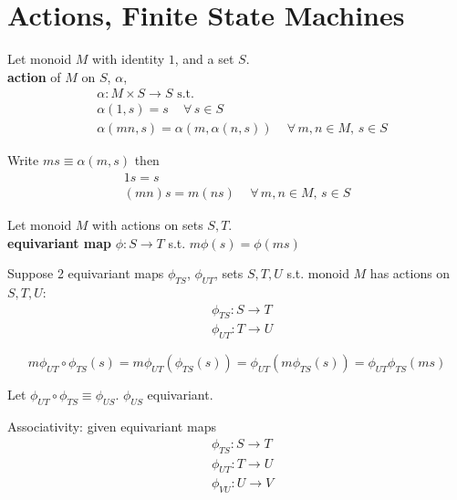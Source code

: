 \section{Actions, Finite State Machines}

\begin{definition}
Let monoid $M$ with identity $1$, and a set $S$. \\
\textbf{action} of $M$ on $S$, $\alpha$, \\
\begin{equation}
\begin{aligned}
& \alpha : M \times S \to S \text{ s.t. } \\  
& \alpha(1,s) = s \quad \, \forall \, s \in S \\
& \alpha(mn, s) = \alpha(m, \alpha(n, s)) \quad \, \forall \, m,n \in M, \, s\in S
\end{aligned}
\end{equation}

Write $ms \equiv \alpha(m, s)$ then 
\[
\begin{gathered} 
1s = s \\
(mn) s = m (ns) \quad \, \forall \, m, n \in M, \, s \in S
\end{gathered}
\]
\end{definition}

\begin{definition}
	Let monoid $M$ with actions on sets $S,T$. \\
	\textbf{equivariant map} $\phi:S \to T$ s.t. $m\phi(s) = \phi(ms)$
\end{definition}

Suppose 2 equivariant maps $\phi_{TS}$, $\phi_{UT}$, sets $S,T,U$ s.t. monoid $M$ has actions on $S,T,U$: 
\[
\begin{aligned}
& \phi_{TS} : S \to T \\ 
& \phi_{UT} : T \to U
\end{aligned}
\]

\[
m\phi_{UT} \circ \phi_{TS}(s) = m \phi_{UT}(\phi_{TS}(s)) = \phi_{UT}(m\phi_{TS}(s)) = \phi_{UT} \phi_{TS} (ms) 
\]

Let $\phi_{UT} \circ \phi_{TS} \equiv \phi_{US}$. $\phi_{US}$ equivariant.

Associativity: given equivariant maps 
\[
\begin{aligned}
& \phi_{TS} : S \to T \\ 
& \phi_{UT} : T \to U \\ 
& \phi_{VU} : U \to V 
\end{aligned}
\]

